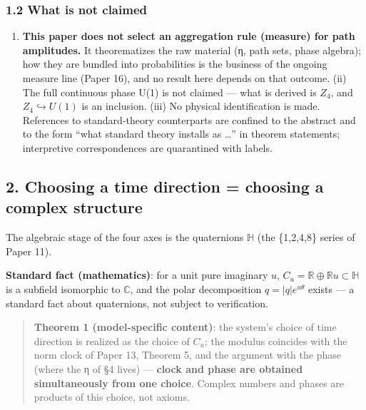 \documentclass[
]{article}
\providecommand{\tightlist}{%
  \setlength{\itemsep}{0pt}\setlength{\parskip}{0pt}}
\begin{document}
\subsubsection{1.2 What is not claimed}\label{what-is-not-claimed}

\begin{enumerate}
\def\labelenumi{(\roman{enumi})}
\tightlist
\item
  \textbf{This paper does not select an aggregation rule (measure) for
  path amplitudes.} It theorematizes the raw material (η, path sets,
  phase algebra); how they are bundled into probabilities is the
  business of the ongoing measure line (Paper 16), and no result here
  depends on that outcome. (ii) The full continuous phase U(1) is not
  claimed --- what is derived is \(Z_4\), and
  \(Z_4\hookrightarrow U(1)\) is an inclusion. (iii) No physical
  identification is made. References to standard-theory counterparts are
  confined to the abstract and to the form ``what standard theory
  installs as \ldots{}'' in theorem statements; interpretive
  correspondences are quarantined with labels.
\end{enumerate}

\subsection{2. Choosing a time direction = choosing a complex
structure}\label{choosing-a-time-direction-choosing-a-complex-structure}

The algebraic stage of the four axes is the quaternions \(\mathbb{H}\)
(the \{1,2,4,8\} series of Paper 11).

\textbf{Standard fact (mathematics)}: for a unit pure imaginary \(u\),
\(C_u=\mathbb{R}\oplus\mathbb{R}u\subset\mathbb{H}\) is a subfield
isomorphic to \(\mathbb{C}\), and the polar decomposition
\(q=|q|e^{u\theta}\) exists --- a standard fact about quaternions, not
subject to verification.

\begin{quote}
\textbf{Theorem 1 (model-specific content)}: the system's choice of time
direction is realized as the choice of \(C_u\); the modulus coincides
with the norm clock of Paper 13, Theorem 5, and the argument with the
phase (where the η of §4 lives) --- \textbf{clock and phase are obtained
simultaneously from one choice}. Complex numbers and phases are products
of this choice, not axioms.
\end{quote}
\end{document}
